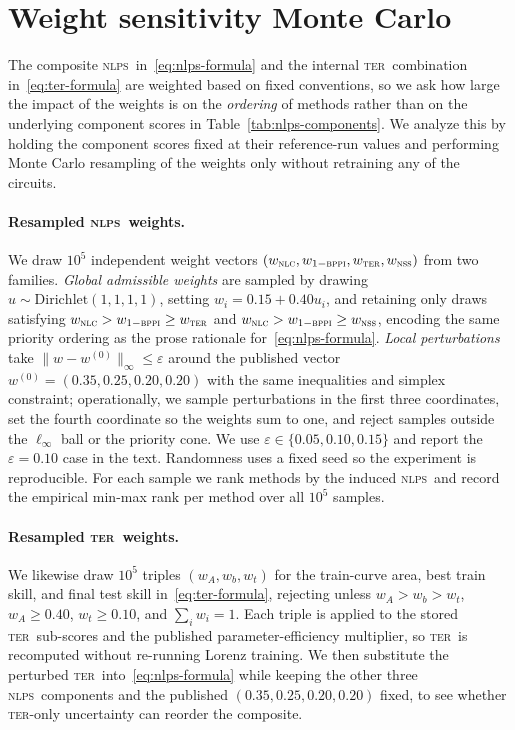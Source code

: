 \documentclass{article}
\newcommand{\nlc}{\textsc{nlc}}
\newcommand{\bppi}{\textsc{bppi}}
\newcommand{\nss}{\textsc{nss}}
\newcommand{\ter}{\textsc{ter}}
\newcommand{\nlps}{\textsc{nlps}}
\begin{document}
\section{Weight sensitivity Monte Carlo}
\label{app:weight-sensitivity}

The composite \nlps\ in~\eqref{eq:nlps-formula} and the internal \ter\ combination in~\eqref{eq:ter-formula} are weighted based on fixed conventions, so we ask how large the impact of the weights is on the \emph{ordering} of methods rather than on the underlying component scores in Table~\ref{tab:nlps-components}.
We analyze this by holding the component scores fixed at their reference-run values and performing Monte Carlo resampling of the weights only without retraining any of the circuits.

\paragraph{Resampled \nlps\ weights.}
We draw $10^5$ independent weight vectors $(w_{\nlc}, w_{1-\bppi}, w_{\ter}, w_{\nss})$ from two families.
\emph{Global admissible weights} are sampled by drawing $u\sim\mathrm{Dirichlet}(1,1,1,1)$, setting $w_i=0.15+0.40u_i$, and retaining only draws satisfying $w_{\nlc} > w_{1-\bppi} \geq w_{\ter}$ and $w_{\nlc} > w_{1-\bppi} \geq w_{\nss}$, encoding the same priority ordering as the prose rationale for~\eqref{eq:nlps-formula}.
\emph{Local perturbations} take $\|w - w^{(0)}\|_\infty \leq \varepsilon$ around the published vector $w^{(0)} = (0.35, 0.25, 0.20, 0.20)$ with the same inequalities and simplex constraint; operationally, we sample perturbations in the first three coordinates, set the fourth coordinate so the weights sum to one, and reject samples outside the $\ell_\infty$ ball or the priority cone.
We use $\varepsilon \in \{0.05, 0.10, 0.15\}$ and report the $\varepsilon = 0.10$ case in the text.
Randomness uses a fixed seed so the experiment is reproducible.
For each sample we rank methods by the induced \nlps\ and record the empirical min-max rank per method over all $10^5$ samples.

\paragraph{Resampled \ter\ weights.}
We likewise draw $10^5$ triples $(w_{A}, w_{b}, w_{t})$ for the train-curve area, best train skill, and final test skill in~\eqref{eq:ter-formula}, rejecting unless $w_{A} > w_{b} > w_{t}$, $w_{A} \geq 0.40$, $w_{t} \geq 0.10$, and $\sum_i w_i = 1$.
Each triple is applied to the stored \ter\ sub-scores and the published parameter-efficiency multiplier, so \ter\ is recomputed without re-running Lorenz training.
We then substitute the perturbed \ter\ into~\eqref{eq:nlps-formula} while keeping the other three \nlps\ components and the published $(0.35, 0.25, 0.20, 0.20)$ fixed, to see whether \ter-only uncertainty can reorder the composite.
\end{document}
